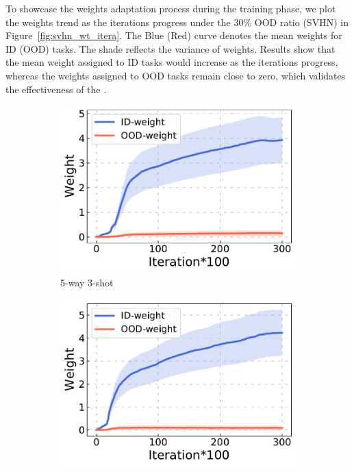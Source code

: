 To showcase the weights adaptation process during the training phase, we plot the weights trend as the iterations progress under the 30\% OOD ratio (SVHN) in Figure~\ref{fig:svhn_wt_itera}. 
The Blue (Red) curve denotes the mean weights for ID (OOD) tasks. The shade reflects the variance of weights. Results show that the mean weight assigned to ID tasks would increase as the iterations progress, whereas the weights assigned to OOD tasks remain close to zero, which validates the effectiveness of the \sysname{}.

\begin{figure}[!t]
\vspace{-5mm}
    \centering
    \begin{subfigure}[b]{0.23\textwidth}
        \centering
        \includegraphics[width=\textwidth]{figs/svhn_5w3s_03.pdf}
        \caption{5-way 3-shot}
    \end{subfigure}
    \begin{subfigure}[b]{0.23\textwidth}
        \centering
        \includegraphics[width=\linewidth]{figs/svhn_5w5s_03.pdf}

\end{subfigure}
\end{figure}
